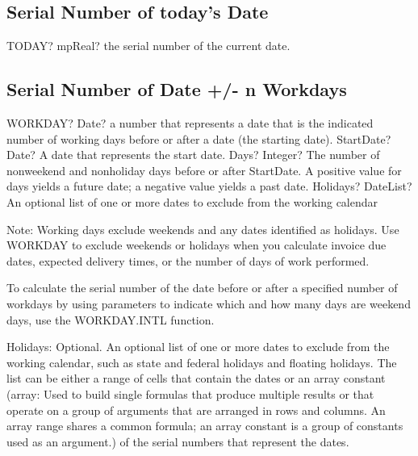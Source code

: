 \subsection{Serial Number of today's Date}

\begin{mpFunctionsExtract}
	\mpWorksheetFunctionZeroNotImplemented
	{TODAY? mpReal? the serial number of the current date.}
\end{mpFunctionsExtract}




\subsection{Serial Number of Date +/- n Workdays}

\begin{mpFunctionsExtract}
	\mpWorksheetFunctionThreeNotImplemented
	{WORKDAY? Date? a number that represents a date that is the indicated number of working days before or after a date (the starting date).}
	{StartDate? Date? A date that represents the start date.}
	{Days? Integer? The number of nonweekend and nonholiday days before or after StartDate. A positive value for days yields a future date; a negative value yields a past date.}
	{Holidays? DateList?  An optional list of one or more dates to exclude from the working calendar}
\end{mpFunctionsExtract}

\vspace{0.3cm}
Note: Working days exclude weekends and any dates identified as holidays. Use WORKDAY to exclude weekends or holidays when you calculate invoice due dates, expected delivery times, or the number of days of work performed.

To calculate the serial number of the date before or after a specified number of workdays by using parameters to indicate which and how many days are weekend days, use the WORKDAY.INTL function.

Holidays:  Optional. An optional list of one or more dates to exclude from the working calendar, such as state and federal holidays and floating holidays. The list can be either a range of cells that contain the dates or an array constant (array: Used to build single formulas that produce multiple results or that operate on a group of arguments that are arranged in rows and columns. An array range shares a common formula; an array constant is a group of constants used as an argument.) of the serial numbers that represent the dates.




